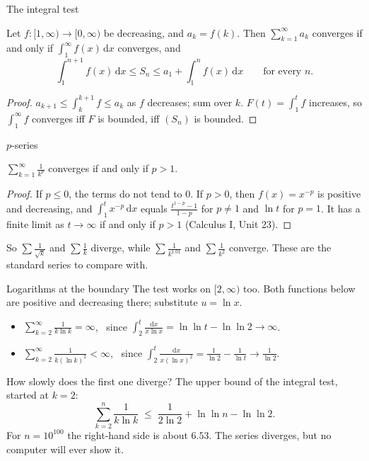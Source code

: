 \documentclass[10pt]{wosm-slides}
\newcommand{\dx}{\,\mathrm{d}x}
\begin{document}
\begin{frame}{The integral test}
  \begin{theorem}
    Let $f\colon [1, \infty) \to [0, \infty)$ be decreasing, and $a_k = f(k)$. Then
    $\sum_{k=1}^\infty a_k$ converges if and only if $\int_1^\infty f(x)\dx$ converges, and
    \[ \int_1^{n+1} f(x)\dx \le S_n \le a_1 + \int_1^n f(x)\dx \qquad\text{for every } n. \]
  \end{theorem}
  \pause
  \begin{proof}
    $a_{k+1} \le \int_k^{k+1} f \le a_k$ as $f$ decreases; sum over $k$.
    $F(t) = \int_1^t f$ increases, so $\int_1^\infty f$ converges iff $F$ is bounded,
    iff $(S_n)$ is bounded.
  \end{proof}
\end{frame}

\begin{frame}{$p$-series}
  \begin{theorem}[$p$-series]
    $\displaystyle\sum_{k=1}^\infty \frac{1}{k^p}$ converges if and only if $p > 1$.
  \end{theorem}
  \pause
  \begin{proof}
    If $p \le 0$, the terms do not tend to $0$. If $p > 0$, then $f(x) = x^{-p}$ is positive
    and decreasing, and $\int_1^t x^{-p} \dx$ equals $\frac{t^{1-p} - 1}{1-p}$ for $p \ne 1$
    and $\ln t$ for $p = 1$. It has a finite limit as $t \to \infty$ if and only if $p > 1$
    (Calculus I, Unit 23).
  \end{proof}
  \pause
  So $\sum \frac{1}{\sqrt k}$ and $\sum \frac1k$ diverge, while $\sum \frac{1}{k^{1.01}}$
  and $\sum \frac{1}{k^2}$ converge. These are the standard series to compare with.
\end{frame}

\begin{frame}{Logarithms at the boundary}
  The test works on $[2, \infty)$ too. Both functions below are positive and decreasing
  there; substitute $u = \ln x$.
  \begin{itemize}
    \item $\displaystyle\sum_{k=2}^\infty \frac{1}{k \ln k} = \infty$, \ since
      $\displaystyle\int_2^t \frac{\mathrm{d}x}{x \ln x} = \ln\ln t - \ln\ln 2 \to \infty$.
    \item $\displaystyle\sum_{k=2}^\infty \frac{1}{k (\ln k)^2} < \infty$, \ since
      $\displaystyle\int_2^t \frac{\mathrm{d}x}{x (\ln x)^2} = \frac{1}{\ln 2} - \frac{1}{\ln t}
      \to \frac{1}{\ln 2}$.
  \end{itemize}
  \pause
  How slowly does the first one diverge? The upper bound of the integral test, started at $k = 2$:
  \[ \sum_{k=2}^{n} \frac{1}{k \ln k} \;\le\; \frac{1}{2 \ln 2} + \ln\ln n - \ln\ln 2 . \]
  For $n = 10^{100}$ the right-hand side is about $6.53$.
  The series diverges, but no computer will ever show it.
\end{frame}
\end{document}
